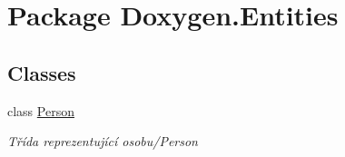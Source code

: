 \hypertarget{namespace_doxygen_1_1_entities}{\section{Package Doxygen.\+Entities}
\label{namespace_doxygen_1_1_entities}
}
\subsection*{Classes}
\begin{DoxyCompactItemize}
\item 
class \hyperlink{class_doxygen_1_1_entities_1_1_person}{Person}
\begin{DoxyCompactList}\small\item\em Třída reprezentující osobu/\+Person \end{DoxyCompactList}\end{DoxyCompactItemize}
